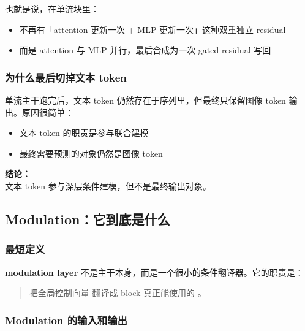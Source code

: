 也就是说，在单流块里：

\begin{itemize}[leftmargin=1.5em]
  \item 不再有「attention 更新一次 + MLP 更新一次」这种双重独立 residual
  \item 而是 attention 与 MLP 并行，最后合成为一次 gated residual 写回
\end{itemize}

\subsubsection{为什么最后切掉文本 token}

单流主干跑完后，文本 token 仍然存在于序列里，但最终只保留图像 token 输出。原因很简单：

\begin{itemize}[leftmargin=1.5em]
  \item 文本 token 的职责是参与联合建模
  \item 最终需要预测的对象仍然是图像 token
\end{itemize}

\begin{summarybox}
\textbf{结论：}\\
文本 token 参与深层条件建模，但不是最终输出对象。
\end{summarybox}

\subsection{Modulation：它到底是什么}

\subsubsection{最短定义}

\textbf{modulation layer} 不是主干本身，而是一个很小的条件翻译器。它的职责是：

\begin{quote}
把全局控制向量  翻译成 block 真正能使用的 。
\end{quote}

\subsubsection{Modulation 的输入和输出}

